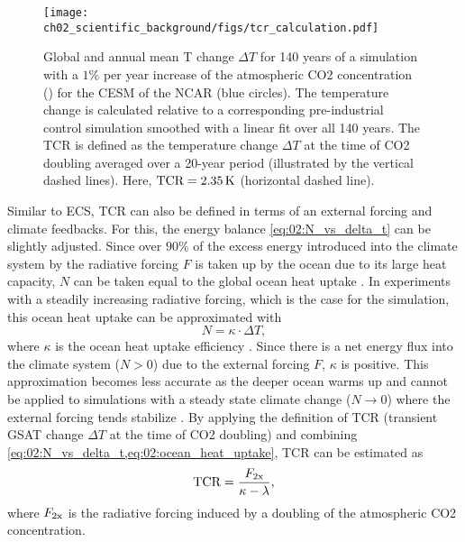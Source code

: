 \begin{figure}[t]
  \centering
  \texttt{[image: 
    ch02\_scientific\_background/figs/tcr\_calculation.pdf]}
  \caption{Global and annual mean \acl{T} change $\Delta T$ for 140 years of a
    simulation with a $1 \unit{\%}$ per year increase of the atmospheric
    \acs{CO2} concentration (\onepctcotwo{}) for the \acf{CESM} of the
    \acf{NCAR} (blue circles). The temperature change is calculated relative
    to a corresponding pre-industrial control simulation smoothed with a
    linear fit over all 140 years. The \acf{TCR} is defined as the temperature
    change $\Delta T$ at the time of \acs{CO2} doubling averaged over a
    20-year period (illustrated by the vertical dashed lines). Here,
    $\mathtxt{TCR} = 2.35 \unit{K}$ (horizontal dashed line).}
  \label{fig:02:tcr}
\end{figure}

Similar to \ac{ECS}, \ac{TCR} can also be defined in terms of an external
forcing and climate feedbacks. For this, the energy balance
\cref{eq:02:N_vs_delta_t} can be slightly adjusted. Since over $90 \unit{\%}$
of the excess energy introduced into the climate system by the radiative
forcing $F$ is taken up by the ocean due to its large heat capacity, $N$ can be
taken equal to the global ocean heat uptake \autocite{Knutti2017}. In
experiments with a steadily increasing radiative forcing, which is the case for
the \onepctcotwo{} simulation, this ocean heat uptake can be approximated with
\begin{equation}
  N = \kappa \cdot \Delta T,
  \label{eq:02:ocean_heat_uptake}
\end{equation}
where $\kappa$ is the ocean heat uptake efficiency \autocite{Gregory2008}.
Since there is a net energy flux into the climate system ($N > 0$) due to the
external forcing $F$, $\kappa$ is positive. This approximation becomes less
accurate as the deeper ocean warms up and cannot be applied to simulations with
a steady state climate change ($N \to 0$) where the external forcing tends
stabilize \autocite{Gregory2009}. By applying the definition of \ac{TCR}
(transient \ac{GSAT} change $\Delta T$ at the time of \ac{CO2} doubling) and
combining \cref{eq:02:N_vs_delta_t,eq:02:ocean_heat_uptake}, \ac{TCR} can be
estimated as
\begin{equation}
  \mathtxt{TCR} = \frac{F_\mathtxt{2x}}{\kappa - \lambda},
  \label{eq:02:tcr}
\end{equation}
where $F_\mathtxt{2x}$ is the radiative forcing induced by a doubling of the
atmospheric \ac{CO2} concentration.

